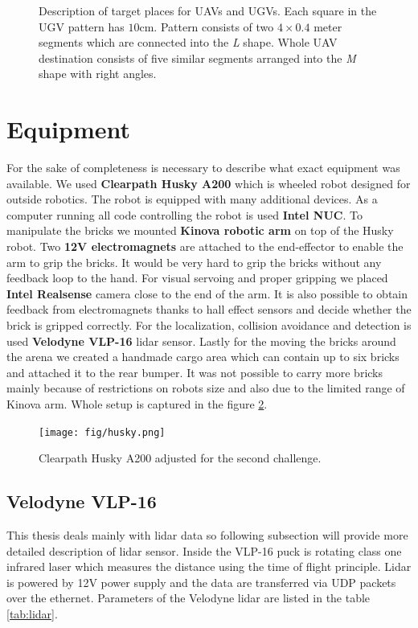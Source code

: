 \begin{figure}[H]
\caption[Brick destinations]{Description of target places for UAVs and UGVs. Each square in the UGV pattern has $10$cm. Pattern consists of two $4\times0.4$ meter segments which are connected into the \textit{L} shape. Whole UAV destination consists of five similar segments arranged into the \textit{M} shape with right angles.}
\label{fig:dest}
\end{figure}


\section{Equipment}
For the sake of completeness is necessary to describe what exact equipment was available. We used \textbf{Clearpath Husky A200} which is wheeled robot designed for outside robotics. The robot is equipped with many additional devices. As a computer running all code controlling the robot is used \textbf{Intel NUC}. To manipulate the bricks we mounted \textbf{Kinova robotic arm} on top of the Husky robot. Two \textbf{12V electromagnets} are attached to the end-effector to enable the arm to grip the bricks. It would be very hard to grip the bricks without any feedback loop to the hand. For visual servoing and proper gripping we placed \textbf{Intel Realsense} camera close to the end of the arm. It is also possible to obtain feedback from electromagnets thanks to hall effect sensors and decide whether the brick is gripped correctly. For the localization, collision avoidance and detection is used \textbf{Velodyne VLP-16} lidar sensor. Lastly for the moving the bricks around the arena we created a handmade cargo area which can contain up to six bricks and attached it to the rear bumper. It was not possible to carry more bricks mainly because of restrictions on robots size and also due to the limited range of Kinova arm. Whole setup is captured in the figure \ref{fig:husky}.

\begin{figure}[H]
\centering
\texttt{[image: fig/husky.png]}
\caption[UGV robot setup]{Clearpath Husky A200 adjusted for the second challenge.}
\label{fig:husky}

\end{figure}

\subsection{Velodyne VLP-16}
This thesis deals mainly with lidar data so following subsection will provide more detailed description of lidar sensor. Inside the VLP-16 puck is rotating class one infrared laser which measures the distance using the time of flight principle. Lidar is powered by 12V power supply and the data are transferred via UDP packets over the ethernet. Parameters of the Velodyne lidar are listed in the table \ref{tab:lidar}.

